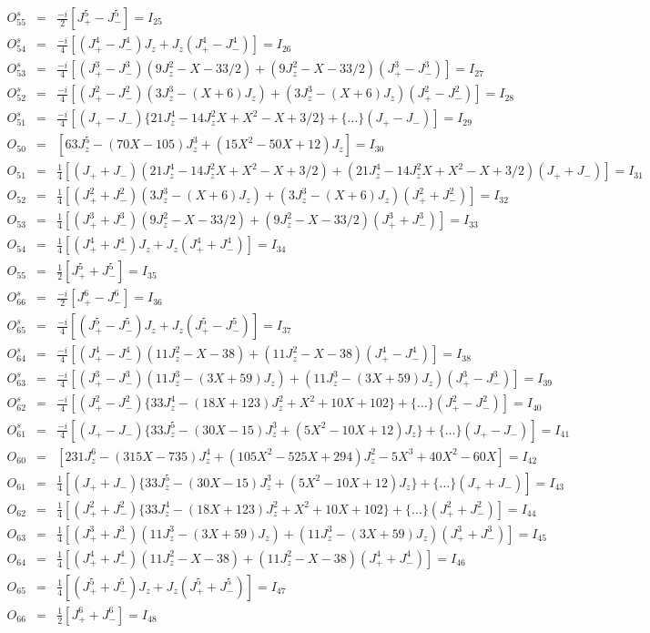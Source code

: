 \begin{eqnarray*}
O^s_{55}&=&\frac{-i}{2}[J_+^5-J_-^5]=I_{25} \\
O^s_{54}&=&\frac{-i}{4}[(J_+^4-J_-^4)J_z+J_z(J_+^4-J_-^4)]=I_{26} \\
O^s_{53}&=&\frac{-i}{4}[(J_+^3-J_-^3)(9J_z^2-X-33/2)+(9J_z^2-X-33/2)(J_+^3-J_-^3)]=I_{27} \\
O^s_{52}&=&\frac{-i}{4}[(J_+^2-J_-^2)(3J_z^3-(X+6)J_z)+(3J_z^3-(X+6)J_z)(J_+^2-J_-^2)]=I_{28}\\
O^s_{51}&=&\frac{-i}{4}[(J_+-J_-)\{21J_z^4-14J_z^2X+X^2-X+3/2\}+\{\dots\}(J_+-J_-)]=I_{29} \\
O_{50}&=&[63J_z^5-(70X-105)J_z^3+(15X^2-50X+12)J_z]=I_{30} \\
O_{51}&=&\frac{1}{4}[(J_++J_-)(21J_z^4-14J_z^2X+X^2-X+3/2)+(21J_z^4-14J_z^2X+X^2-X+3/2)(J_++J_-)]=I_{31} \\
O_{52}&=&\frac{1}{4}[(J_+^2+J_-^2)(3J_z^3-(X+6)J_z)+(3J_z^3-(X+6)J_z)(J_+^2+J_-^2)] =I_{32}\\
O_{53}&=&\frac{1}{4}[(J_+^3+J_-^3)(9J_z^2-X-33/2)+(9J_z^2-X-33/2)(J_+^3+J_-^3)]=I_{33} \\
O_{54}&=&\frac{1}{4}[(J_+^4+J_-^4)J_z+J_z(J_+^4+J_-^4)]=I_{34} \\
O_{55}&=&\frac{1}{2}[J_+^5+J_-^5]=I_{35} \\
\hline
O^s_{66}&=&\frac{-i}{2}[J_+^6-J_-^6]=I_{36}\\
O^s_{65}&=&\frac{-i}{4}[(J_+^5-J_-^5)J_z+J_z(J_+^5-J_-^5)] =I_{37}\\
O^s_{64}&=&\frac{-i}{4}[(J_+^4-J_-^4)(11J_z^2-X-38)+(11J_z^2-X-38)(J_+^4-J_-^4)]=I_{38} \\
O^s_{63}&=&\frac{-i}{4}[(J_+^3-J_-^3)(11J_z^3-(3X+59)J_z)+(11J_z^3-(3X+59)J_z)(J_+^3-J_-^3)]=I_{39} \\
O^s_{62}&=&\frac{-i}{4}[(J_+^2-J_-^2)\{33J_z^4-(18X+123)J_z^2+X^2+10X+102\}+\{\dots\}(J_+^2-J_-^2)]=I_{40} \\
O^s_{61}&=&\frac{-i}{4}[(J_+-J_-)\{33J_z^5-(30X-15)J_z^3+(5X^2-10X+12)J_z\}+\{\dots\}(J_+-J_-)]=I_{41} \\
O_{60}&=&[231J_z^6-(315X-735)J_z^4+(105X^2-525X+294)J_z^2-5X^3+40X^2-60X]=I_{42} \\
O_{61}&=&\frac{1}{4}[(J_++J_-)\{33J_z^5-(30X-15)J_z^3+(5X^2-10X+12)J_z\}+\{\dots\}(J_++J_-)]=I_{43} \\
O_{62}&=&\frac{1}{4}[(J_+^2+J_-^2)\{33J_z^4-(18X+123)J_z^2+X^2+10X+102\}+\{\dots\}(J_+^2+J_-^2)]=I_{44} \\
O_{63}&=&\frac{1}{4}[(J_+^3+J_-^3)(11J_z^3-(3X+59)J_z)+(11J_z^3-(3X+59)J_z)(J_+^3+J_-^3)]=I_{45} \\
O_{64}&=&\frac{1}{4}[(J_+^4+J_-^4)(11J_z^2-X-38)+(11J_z^2-X-38)(J_+^4+J_-^4)]=I_{46} \\
O_{65}&=&\frac{1}{4}[(J_+^5+J_-^5)J_z+J_z(J_+^5+J_-^5)]=I_{47} \\
O_{66}&=&\frac{1}{2}[J_+^6+J_-^6]=I_{48}\\
\end{eqnarray*}



